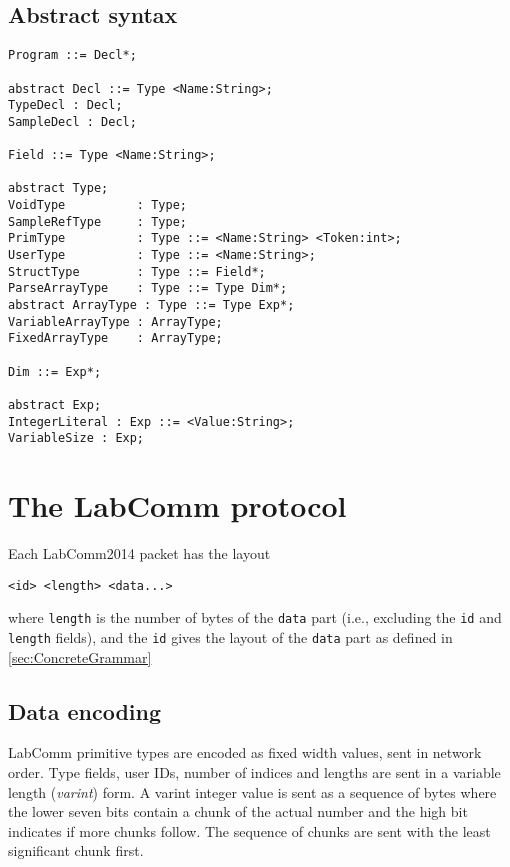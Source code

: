 \documentclass[a4paper]{article}
\begin{document}
\subsection{Abstract syntax}
\begin{verbatim}
Program ::= Decl*;

abstract Decl ::= Type <Name:String>;
TypeDecl : Decl;
SampleDecl : Decl;

Field ::= Type <Name:String>;

abstract Type;
VoidType          : Type;
SampleRefType     : Type;
PrimType          : Type ::= <Name:String> <Token:int>;
UserType          : Type ::= <Name:String>;
StructType        : Type ::= Field*;
ParseArrayType    : Type ::= Type Dim*;
abstract ArrayType : Type ::= Type Exp*;
VariableArrayType : ArrayType;
FixedArrayType    : ArrayType;

Dim ::= Exp*;

abstract Exp;
IntegerLiteral : Exp ::= <Value:String>;
VariableSize : Exp;
\end{verbatim}

\newpage
\section{The LabComm protocol}
\label{sec:ProtocolGrammar}

Each LabComm2014 packet has the layout
\begin{verbatim}
<id> <length> <data...>
\end{verbatim}
where \verb+length+ is the number of bytes of the \verb+data+ part
(i.e., excluding the \verb+id+ and \verb+length+ fields), and 
the \verb+id+ gives the layout of the \verb+data+ part as defined 
in \ref{sec:ConcreteGrammar}
\subsection{Data encoding}
LabComm primitive types are encoded as fixed width values, sent in
network order.  Type fields, user IDs, number of indices and lengths are
sent in a variable length (\emph{varint}) form.  A varint integer value
is sent as a sequence of bytes where the lower seven bits contain a
chunk of the actual number and the high bit indicates if more chunks
follow. The sequence of chunks are sent with the least significant chunk
first.  
\end{document}
